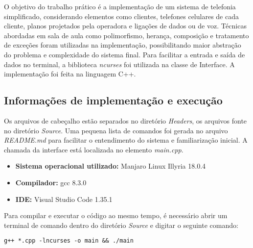 O objetivo do trabalho prático é a implementação de um sistema de telefonia simplificado, considerando elementos como clientes, telefones celulares de cada cliente, planos projetados pela operadora e ligações de dados ou de voz. Técnicas abordadas em sala de aula como polimorfismo, herança, composição e tratamento de exceções foram utilizadas na implementação, possibilitando maior abstração do problema e complexidade do sistema final. Para facilitar a entrada e saída de dados no terminal, a biblioteca \textit{ncurses} foi utilizada na classe de Interface. A implementação foi feita na linguagem C++. 

\subsection{Informações de implementação e execução}
Os arquivos de cabeçalho estão separados no diretório \textit{Headers}, os arquivos fonte no diretório \textit{Source}. Uma pequena lista de comandos foi gerada no arquivo \textit{README.md} para facilitar o entendimento do sistema e familiarização inicial. A chamada da interface está localizada no elemento \textit{main.cpp}. 

\begin{itemize}
	\item \textbf{Sistema operacional utilizado:} Manjaro Linux Illyria 18.0.4
	\item \textbf{Compilador:} gcc 8.3.0 
	\item \textbf{IDE:} Visual Studio Code 1.35.1
\end{itemize}

Para compilar e executar o código ao mesmo tempo, é necessário abrir um terminal de comando dentro do diretório \textit{Source} e digitar o seguinte comando:

\texttt{g++ *.cpp -lncurses -o main \&\& ./main}

